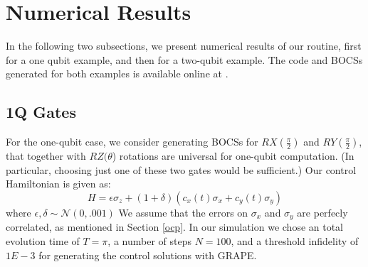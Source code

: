 \documentclass[aps,nofootinbib,pra,notitlepage,twocolumn]{revtex4-1}
\begin{document}



\section{Numerical Results}\label{numerical}
In the following two subsections, we present numerical results of our routine, first for a one qubit example, and then for a two-qubit example. The code and BOCSs generated for both examples is available online at \cite{decorrelating_errors}.
\subsection{1Q Gates}\label{1Q Gates}
 For the one-qubit case, we consider generating BOCSs for $RX(\frac{\pi}{2})$ and $RY(\frac{\pi}{2})$, that together with $RZ(\theta$) rotations are universal for one-qubit computation. (In particular, choosing just one of these two gates would be sufficient.) Our control Hamiltonian is given as:
\begin{equation}\label{eq:1Qham}
  H = \epsilon\sigma_z + (1 + \delta)(c_x(t)\sigma_x + c_y(t)\sigma_y)
\end{equation}
where $\epsilon, \delta \sim \mathcal{N}(0, .001)$ We assume that the errors on $\sigma_x$ and $\sigma_y$ are perfecly correlated, as mentioned in Section \ref{ocp}. In our simulation we chose an total evolution time of $T=\pi$, a number of steps $N=100$, and a threshold infidelity of $1E-3$ for generating the control solutions with GRAPE.
\end{document}

